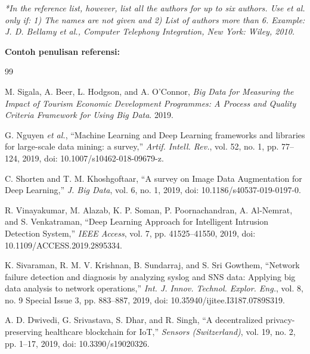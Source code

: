 \documentclass[10pt,a4paper]{article}
\begin{document}
\textit{*In the reference list, however, list all the authors for up to six authors. Use et al. only if: 1) The names are not given and 2) List of authors more than 6. Example: J. D. Bellamy et al., Computer Telephony Integration, New York: Wiley, 2010.}

\vspace{6pt}
\noindent\textbf{Contoh penulisan referensi:}
\endgroup

\begingroup
\renewcommand{\section}[2]{}%
\begin{thebibliography}{99}
\fontsize{8pt}{10pt}\selectfont
\setlength{\itemsep}{1pt}
\setlength{\parskip}{0pt}

M. Sigala, A. Beer, L. Hodgson, and A. O'Connor, \textit{Big Data for Measuring the Impact of Tourism Economic Development Programmes: A Process and Quality Criteria Framework for Using Big Data}. 2019.

G. Nguyen \textit{et al.}, ``Machine Learning and Deep Learning frameworks and libraries for large-scale data mining: a survey,'' \textit{Artif. Intell. Rev.}, vol. 52, no. 1, pp. 77--124, 2019, doi: 10.1007/s10462-018-09679-z.

C. Shorten and T. M. Khoshgoftaar, ``A survey on Image Data Augmentation for Deep Learning,'' \textit{J. Big Data}, vol. 6, no. 1, 2019, doi: 10.1186/s40537-019-0197-0.

R. Vinayakumar, M. Alazab, K. P. Soman, P. Poornachandran, A. Al-Nemrat, and S. Venkatraman, ``Deep Learning Approach for Intelligent Intrusion Detection System,'' \textit{IEEE Access}, vol. 7, pp. 41525--41550, 2019, doi: 10.1109/ACCESS.2019.2895334.

K. Sivaraman, R. M. V. Krishnan, B. Sundarraj, and S. Sri Gowthem, ``Network failure detection and diagnosis by analyzing syslog and SNS data: Applying big data analysis to network operations,'' \textit{Int. J. Innov. Technol. Explor. Eng.}, vol. 8, no. 9 Special Issue 3, pp. 883--887, 2019, doi: 10.35940/ijitee.I3187.0789S319.

A. D. Dwivedi, G. Srivastava, S. Dhar, and R. Singh, ``A decentralized privacy-preserving healthcare blockchain for IoT,'' \textit{Sensors (Switzerland)}, vol. 19, no. 2, pp. 1--17, 2019, doi: 10.3390/s19020326.


\end{thebibliography}
\end{document}
